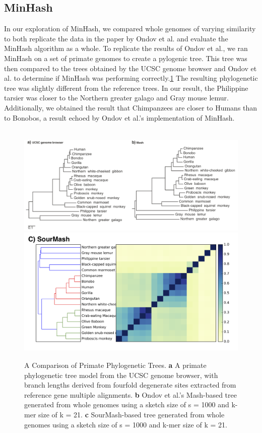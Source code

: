 \documentclass[12pt, letterpaper]{article}
\begin{document}
\subsection{MinHash}
In our exploration of MinHash, we compared whole genomes of varying similarity to both replicate the data in the paper by Ondov et al. and evaluate the MinHash algorithm as a whole. To replicate the results of Ondov et al., we ran MinHash on a set of primate genomes to create a pylogenic tree. This tree was then compared to the trees obtained by the UCSC genome browser and Ondov et al. to determine if MinHash was performing correctly.\ref{fig:Primate Tree} The resulting phylogenetic tree was slightly different from the reference trees. In our result, the Philippine tarsier was closer to the Northern greater galago and Gray mouse lemur. Additionally, we obtained the result that Chimpanzees are closer to Humans than to Bonobos, a result echoed by Ondov et al.'s implementation of MinHash. \\ \\
\begin{figure}[h]
    \centering
    \includegraphics[width=1.0\textwidth]{Figure4_Ondov}
    \includegraphics[width=1.0\textwidth]{Apes_Matrix_Common}
    \caption{A Comparison of Primate Phylogenetic Trees. \textbf{a} A primate phylogenetic tree model from the UCSC genome browser, with branch lengths derived from fourfold degenerate sites extracted from reference gene multiple alignments. \textbf{b} Ondov et al.'s Mash-based tree generated from whole genomes using a sketch size of s = 1000 and k-mer size of k = 21.\cite{MinHash} \textbf{c} SourMash-based tree generated from whole genomes using a sketch size of s = 1000 and k-mer size of k = 21.}
    \label{fig:Primate Tree}
\end{figure}
\end{document}
